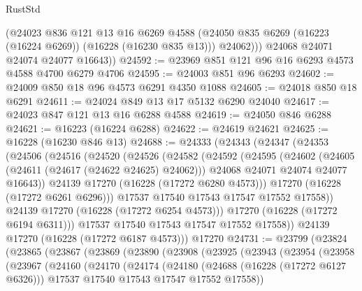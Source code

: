 \begin{lexlean}{RustStd}
\begin{coremodule}
            (@24023
              @836
              @121
              @13
              @16
              @6269
              @4588
              (@24050 @835 @6269 (@16223 (@16224 @6269)) (@16228 (@16230 @835 @13)))
              @24062)))
        @24068
        @24071
        @24074
        @24077
        @16643))
@24592 := @23969 @851 @121 @96 @16 @6293 @4573 @4588 @4700 @6279 @4706
@24595 := @24003 @851 @96 @6293
@24602 := @24009 @850 @18 @96 @4573 @6291 @4350 @1088
@24605 := @24018 @850 @18 @6291
@24611 := @24024 @849 @13 @17 @5132 @6290 @24040
@24617 := @24023 @847 @121 @13 @16 @6288 @4588
@24619 := @24050 @846 @6288
@24621 := @16223 (@16224 @6288)
@24622 := @24619 @24621
@24625 := @16228 (@16230 @846 @13)
@24688 := @24333
    (@24343
      (@24347
        (@24353
          (@24506
            (@24516
              (@24520
                (@24526
                  (@24582
                    (@24592
                      (@24595
                        (@24602
                          (@24605 (@24611 (@24617 (@24622 @24625) @24062)))
                          @24068
                          @24071
                          @24074
                          @24077
                          @16643))
                      @24139
                      @17270
                      (@16228 (@17272 @6280 @4573)))
                    @17270
                    (@16228 (@17272 @6261 @6296)))
                  @17537
                  @17540
                  @17543
                  @17547
                  @17552
                  @17558))
              @24139
              @17270
              (@16228 (@17272 @6254 @4573)))
            @17270
            (@16228 (@17272 @6194 @6311)))
          @17537
          @17540
          @17543
          @17547
          @17552
          @17558))
      @24139
      @17270
      (@16228 (@17272 @6187 @4573)))
    @17270
@24731 := @23799
    (@23824
      (@23865
        (@23867
          (@23869
            (@23890
              (@23908
                (@23925
                  (@23943
                    (@23954
                      (@23958
                        (@23967
                          (@24160
                            (@24170
                              (@24174
                                (@24180
                                  (@24688 (@16228 (@17272 @6127 @6326)))
                                  @17537
                                  @17540
                                  @17543
                                  @17547
                                  @17552
                                  @17558))

\end{coremodule}
\end{lexlean}
